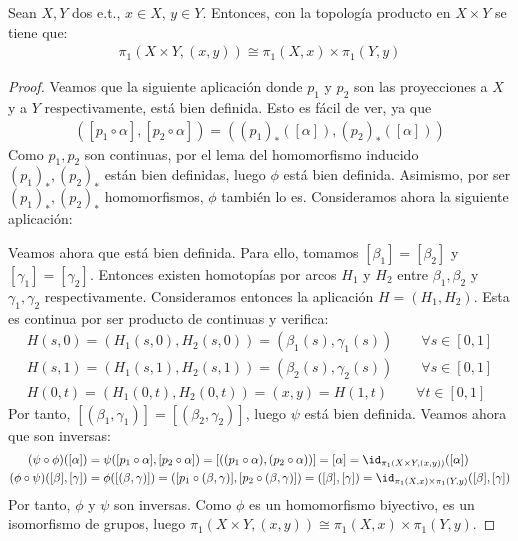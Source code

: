 \begin{teo}
    Sean $X,Y$ dos e.t., $x\in X$, $y\in Y$. Entonces, con la topología producto en $X\times Y$ se tiene que: 
    \begin{gather*}
        \pi_1(X\times Y, (x,y)) \cong \pi_1(X,x) \times \pi_1(Y,y)
    \end{gather*}
    \begin{proof}
        Veamos que la siguiente aplicación
        donde $p_1$ y $p_2$ son las proyecciones a $X$ y a $Y$ respectivamente, está bien definida. Esto es fácil de ver, ya que 
        \begin{gather*}
            ([p_1 \circ \alpha], [p_2\circ \alpha]) = ((p_1)_*([\alpha]), (p_2)_*([\alpha]))
        \end{gather*}
        Como $p_1,p_2$ son continuas, por el lema del homomorfismo inducido $(p_1)_*,(p_2)_*$ están bien definidas, luego $\phi$ está bien definida. Asimismo, por ser $(p_1)_*,(p_2)_*$ homomorfismos, $\phi$ también lo es. Consideramos ahora la siguiente aplicación:

        Veamos ahora que está bien definida. Para ello, tomamos $[\beta_1] = [\beta_2]$ y $[\gamma_1] = [\gamma_2]$. Entonces existen homotopías por arcos $H_1$ y $H_2$ entre $\beta_1,\beta_2$ y $\gamma_1,\gamma_2$ respectivamente. Consideramos entonces la aplicación $H=(H_1,H_2)$. Esta es continua por ser producto de continuas y verifica:
        \begin{gather*}
            H(s,0) = (H_1(s,0), H_2(s,0)) = (\beta_1(s), \gamma_1(s))\qquad \forall s\in [0,1]\\
            H(s,1) = (H_1(s,1), H_2(s,1)) = (\beta_2(s), \gamma_2(s))\qquad \forall s\in [0,1]\\
            H(0,t) = (H_1(0,t), H_2(0,t)) = (x,y) = H(1,t)\qquad \forall t\in [0,1]
        \end{gather*}
        Por tanto, $[(\beta_1,\gamma_1)] = [(\beta_2,\gamma_2)]$, luego $\psi$ está bien definida. Veamos ahora que son inversas:
        \begin{align*}
            (\psi \circ \phi)([\alpha]) &= \psi([p_1\circ \alpha], [p_2\circ \alpha]) = [((p_1\circ \alpha), (p_2\circ \alpha))] = [\alpha] = \id_{\pi_1(X\times Y, (x,y))}([\alpha])
            \\
            (\phi \circ \psi)([\beta], [\gamma]) &= \phi([(\beta, \gamma)]) = ([p_1\circ (\beta, \gamma)], [p_2\circ (\beta, \gamma)]) = ([\beta], [\gamma]) = \id_{\pi_1(X,x) \times \pi_1(Y,y)}([\beta], [\gamma])
        \end{align*}
        Por tanto, $\phi$ y $\psi$ son inversas. Como $\phi$ es un homomorfismo biyectivo, es un isomorfismo de grupos, luego $\pi_1(X\times Y, (x,y)) \cong \pi_1(X,x) \times \pi_1(Y,y)$.
    \end{proof}
\end{teo}

